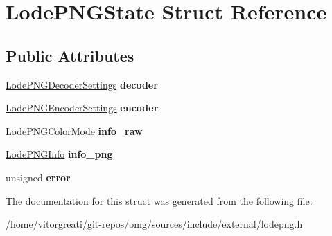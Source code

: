 \hypertarget{struct_lode_p_n_g_state}{}\section{Lode\+P\+N\+G\+State Struct Reference}
\label{struct_lode_p_n_g_state}
\subsection*{Public Attributes}
\begin{DoxyCompactItemize}
\item 
\mbox{\label{struct_lode_p_n_g_state_abd2c38ffc68f04b0e4159e1f97ba1f76}} 
\mbox{\hyperlink{struct_lode_p_n_g_decoder_settings}{Lode\+P\+N\+G\+Decoder\+Settings}} {\bfseries decoder}
\item 
\mbox{\label{struct_lode_p_n_g_state_ac63d91db835129d02eb83bbe81de347e}} 
\mbox{\hyperlink{struct_lode_p_n_g_encoder_settings}{Lode\+P\+N\+G\+Encoder\+Settings}} {\bfseries encoder}
\item 
\mbox{\label{struct_lode_p_n_g_state_a597bc08de787147474d43adf8b6ceacf}} 
\mbox{\hyperlink{struct_lode_p_n_g_color_mode}{Lode\+P\+N\+G\+Color\+Mode}} {\bfseries info\+\_\+raw}
\item 
\mbox{\label{struct_lode_p_n_g_state_a08d9ac43c995fcf34d72b1d37047b6fa}} 
\mbox{\hyperlink{struct_lode_p_n_g_info}{Lode\+P\+N\+G\+Info}} {\bfseries info\+\_\+png}
\item 
\mbox{\label{struct_lode_p_n_g_state_a1a00a050da588cf3c2b7a6252bebb0cd}} 
unsigned {\bfseries error}
\end{DoxyCompactItemize}


The documentation for this struct was generated from the following file\+:\begin{DoxyCompactItemize}
\item 
/home/vitorgreati/git-\/repos/omg/sources/include/external/lodepng.\+h\end{DoxyCompactItemize}
